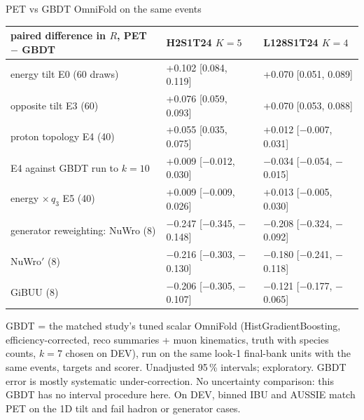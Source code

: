 \documentclass[aspectratio=169,10pt]{beamer}
\def\evidencetext{}
\begin{document}
\gdef\evidencetext{\texttt{../gbdt\_comparison/results/comparison.json}; \texttt{../gbdt\_comparison/REPORT-20261005.md}}
\begin{frame}{PET vs GBDT OmniFold on the same events}
{\scriptsize
\begin{tabular}{lll}
\toprule
paired difference in $R$, PET $-$ GBDT & H2S1T24 $K{=}5$ & L128S1T24 $K{=}4$ \\
\midrule
energy tilt E0 (60 draws) & +0.102 [0.084, 0.119] & +0.070 [0.051, 0.089] \\
opposite tilt E3 (60) & +0.076 [0.059, 0.093] & +0.070 [0.053, 0.088] \\
proton topology E4 (40) & +0.055 [0.035, 0.075] & +0.012 [\ensuremath{-}0.007, 0.031] \\
\quad E4 against GBDT run to $k{=}10$ & +0.009 [\ensuremath{-}0.012, 0.030] & \ensuremath{-}0.034 [\ensuremath{-}0.054, \ensuremath{-}0.015] \\
energy $\times\,q_3$ E5 (40) & +0.009 [\ensuremath{-}0.009, 0.026] & +0.013 [\ensuremath{-}0.005, 0.030] \\
generator reweighting: NuWro (8) & \ensuremath{-}0.247 [\ensuremath{-}0.345, \ensuremath{-}0.148] & \ensuremath{-}0.208 [\ensuremath{-}0.324, \ensuremath{-}0.092] \\
\quad NuWro$'$ (8) & \ensuremath{-}0.216 [\ensuremath{-}0.303, \ensuremath{-}0.130] & \ensuremath{-}0.180 [\ensuremath{-}0.241, \ensuremath{-}0.118] \\
\quad GiBUU (8) & \ensuremath{-}0.206 [\ensuremath{-}0.305, \ensuremath{-}0.107] & \ensuremath{-}0.121 [\ensuremath{-}0.177, \ensuremath{-}0.065] \\
\bottomrule
\end{tabular}}\par{}\par\vspace{0.1cm}\tiny GBDT = the matched study's tuned scalar OmniFold (HistGradientBoosting, efficiency-corrected, reco summaries + muon kinematics, truth with species counts, $k{=}7$ chosen on DEV), run on the same look-1 final-bank units with the same events, targets and scorer. Unadjusted 95\,\% intervals; exploratory. GBDT error is mostly systematic under-correction. No uncertainty comparison: this GBDT has no interval procedure here. On DEV, binned IBU and AUSSIE match PET on the 1D tilt and fail hadron or generator cases.
\end{frame}
\end{document}
